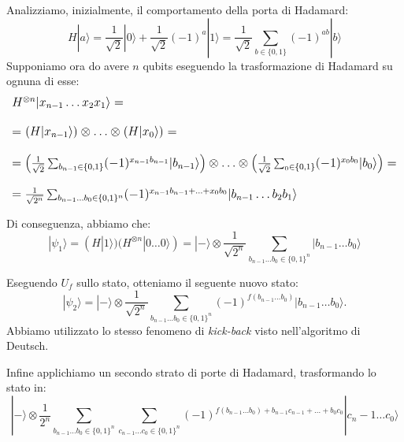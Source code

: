 Analizziamo, inizialmente, il comportamento della porta di Hadamard:
\begin{equation*}
    H|a\rangle = \frac{1}{\sqrt{2}}|0\rangle + \frac{1}{\sqrt{2}}(-1)^a|1\rangle = \frac{1}{\sqrt{2}} \sum_{b \in \{0,1\}} (-1)^{ab}|b\rangle
\end{equation*}
Supponiamo ora do avere $n$ qubits eseguendo la trasformazione di Hadamard su ognuna di esse:
\begin{equation*}
\large
        \begin{array}{l}
            H^{\otimes n}|x_{n-1}\hdots x_2 x_1\rangle = \\ \\
            = \left(H|x_{n-1}\rangle\right) \otimes \hdots \otimes \left(H|x_{0}\rangle\right) = \\ \\
            = \left(\frac{1}{\sqrt{2}} \sum_{b_{n-1} \in \{0,1\}} (-1)^{x_{n-1}b_{n-1}}|b_{n-1}\rangle\right) \otimes \hdots \otimes \left(\frac{1}{\sqrt{2}} \sum_{_0 \in \{0,1\}} (-1)^{x_{0}b_0}|b_0\rangle\right) = \\ \\
            = \frac{1}{\sqrt{2^n}} \sum_{b_{n-1} \hdots b_0 \in \{0,1\}^n} (-1)^{x_{n-1}b_{n-1} + \hdots + x_{0}b_{0}} |b_{n-1}\hdots b_2 b_1\rangle
        \end{array}
\end{equation*}

Di conseguenza, abbiamo che:
\begin{equation*}
    |\psi_1\rangle = (H|1\rangle)(H^{\otimes n}|0 \hdots 0\rangle) = |-\rangle \otimes \frac{1}{\sqrt{2^n}}\sum_{b_{n-1} \hdots b_0 \in \{0,1\}^n} |b_{n-1} \hdots b_0\rangle
\end{equation*}

Eseguendo $U_f$ sullo stato, otteniamo il seguente nuovo stato:
\begin{equation*}
    |\psi_2\rangle = |-\rangle \otimes \frac{1}{\sqrt{2^n}}\sum_{b_{n-1}\hdots b_0 \in \{0,1\}^n} (-1)^{f(b_{n-1} \hdots b_0)}|b_{n-1} \hdots b_0\rangle.
\end{equation*}
Abbiamo utilizzato lo stesso fenomeno di \textit{kick-back} visto nell'algoritmo
di Deutsch.

Infine applichiamo un secondo strato di porte di Hadamard, trasformando lo stato in:
\begin{equation*}
    |-\rangle \otimes \frac{1}{2^n} \sum_{b_{n-1}\hdots b_0 \in \{0,1\}^n} \sum_{c_{n-1}\hdots c_0 \in \{0,1\}^n} (-1)^{f(b_{n-1} \hdots b_0) + b_{n-1}c_{n-1} + \hdots + b_0c_0}|c_n-1 \hdots c_0\rangle
\end{equation*}
